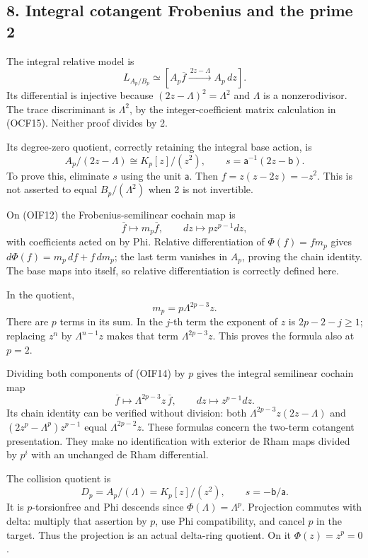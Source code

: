 \documentclass[
]{article}
\begin{document}
\subsection{8. Integral cotangent Frobenius and the prime
2}\label{integral-cotangent-frobenius-and-the-prime-2}

The integral relative model is \[
L_{A_p/B_p}\simeq
[A_p\overline f\xrightarrow{\,2z-\Lambda\,}A_p\,dz].
\tag{OIF12}
\] Its differential is injective because \((2z-\Lambda)^2=\Lambda^2\)
and \(\Lambda\) is a nonzerodivisor. The trace discriminant is
\(\Lambda^2\), by the integer-coefficient matrix calculation in (OCF15).
Neither proof divides by 2.

Its degree-zero quotient, correctly retaining the integral base action,
is \[
A_p/(2z-\Lambda)\cong K_p[z]/(z^2),
\qquad s=\mathsf a^{-1}(2z-\mathsf b).
\tag{OIF13}
\] To prove this, eliminate \(s\) using the unit \(\mathsf a\). Then
\(f=z(z-2z)=-z^2\). This is not asserted to equal \(B_p/(\Lambda^2)\)
when 2 is not invertible.

On (OIF12) the Frobenius-semilinear cochain map is \[
\overline f\mapsto m_p\overline f,\qquad
dz\mapsto pz^{p-1}dz,
\tag{OIF14}
\] with coefficients acted on by Phi. Relative differentiation of
\(\Phi(f)=fm_p\) gives \(d\Phi(f)=m_p\,df+f\,dm_p\); the last term
vanishes in \(A_p\), proving the chain identity. The base maps into
itself, so relative differentiation is correctly defined here.

In the quotient, \[
m_p=p\Lambda^{2p-3}z.
\tag{OIF15}
\] There are \(p\) terms in its sum. In the \(j\)-th term the exponent
of \(z\) is \(2p-2-j\ge1\); replacing \(z^n\) by \(\Lambda^{n-1}z\)
makes that term \(\Lambda^{2p-3}z\). This proves the formula also at
\(p=2\).

Dividing both components of (OIF14) by \(p\) gives the integral
semilinear cochain map \[
\overline f\mapsto\Lambda^{2p-3}z\,\overline f,\qquad
dz\mapsto z^{p-1}dz.
\tag{OIF16}
\] Its chain identity can be verified without division: both
\(\Lambda^{2p-3}z(2z-\Lambda)\) and \((2z^p-\Lambda^p)z^{p-1}\) equal
\(\Lambda^{2p-2}z\). These formulas concern the two-term cotangent
presentation. They make no identification with exterior de Rham maps
divided by \(p^i\) with an unchanged de Rham differential.

The collision quotient is \[
D_p=A_p/(\Lambda)=K_p[z]/(z^2),\qquad
s=-\mathsf b/\mathsf a.
\tag{OIF17}
\] It is \(p\)-torsionfree and Phi descends since
\(\Phi(\Lambda)=\Lambda^p\). Projection commutes with delta: multiply
that assertion by \(p\), use Phi compatibility, and cancel \(p\) in the
target. Thus the projection is an actual delta-ring quotient. On it
\(\Phi(z)=z^p=0\).
\end{document}
